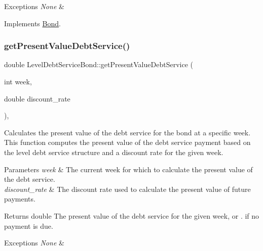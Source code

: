 \begin{DoxyExceptions}{Exceptions}
{\em None} & \\
\hline
\end{DoxyExceptions}


Implements \mbox{\hyperlink{classBond_a5997278813deb16aa5d01bbca8ecc7b2}{Bond}}.

\mbox{\label{classLevelDebtServiceBond_a37801ecfc13ae1b6e05b4330398a7582}} 
\subsubsection{\texorpdfstring{get\+Present\+Value\+Debt\+Service()}{getPresentValueDebtService()}}
{\footnotesize\ttfamily double Level\+Debt\+Service\+Bond\+::get\+Present\+Value\+Debt\+Service (\begin{DoxyParamCaption}\item[{int}]{week,  }\item[{double}]{discount\+\_\+rate }\end{DoxyParamCaption})\hspace{0.3cm}{\ttfamily [override]}, {\ttfamily [virtual]}}



Calculates the present value of the debt service for the bond at a specific week. This function computes the present value of the debt service payment based on the level debt service structure and a discount rate for the given week. 


\begin{DoxyParams}{Parameters}
{\em week} & The current week for which to calculate the present value of the debt service. \\
\hline
{\em discount\+\_\+rate} & The discount rate used to calculate the present value of future payments.\\
\hline
\end{DoxyParams}
\begin{DoxyReturn}{Returns}
double The present value of the debt service for the given week, or {.} if no payment is due.
\end{DoxyReturn}

\begin{DoxyExceptions}{Exceptions}
{\em None} & \\
\hline
\end{DoxyExceptions}


